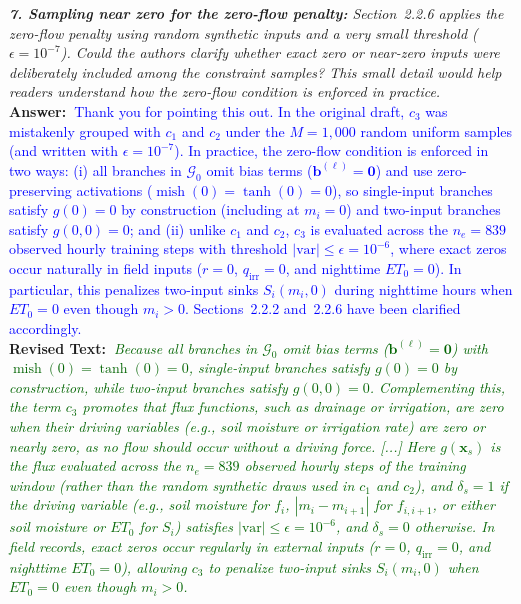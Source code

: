 \documentclass[10pt]{article}
\newcommand{\query}[2][]{\ifthenelse{\equal{#1}{}}{}{\textbf{#1:}~}\emph{#2}}
\newcommand{\ans}[1]{\textbf{Answer:~}#1}
\newcommand{\Rtext}[1]{\textbf{Revised Text:~}#1}
\begin{document}
\query[R-2.7]{\textbf{7. Sampling near zero for the zero-flow penalty:} Section~2.2.6 applies the zero-flow penalty using random synthetic inputs and a very small threshold ($\epsilon = 10^{-7}$). Could the authors clarify whether exact zero or near-zero inputs were deliberately included among the constraint samples? This small detail would help readers understand how the zero-flow condition is enforced in practice.}\\
\ans{\textcolor{blue}{Thank you for pointing this out. In the original draft, $c_3$ was mistakenly grouped with $c_1$ and $c_2$ under the $M = 1{,}000$ random uniform samples (and written with $\epsilon = 10^{-7}$). In practice, the zero-flow condition is enforced in two ways: (i) all branches in $\mathcal{G}_0$ omit bias terms ($\mathbf{b}^{(\ell)} = \mathbf{0}$) and use zero-preserving activations ($\operatorname{mish}(0) = \tanh(0) = 0$), so single-input branches satisfy $g(0) = 0$ by construction (including at $m_i = 0$) and two-input branches satisfy $g(0,0) = 0$; and (ii) unlike $c_1$ and $c_2$, $c_3$ is evaluated across the $n_e = 839$ observed hourly training steps with threshold $|\text{var}| \le \epsilon = 10^{-6}$, where exact zeros occur naturally in field inputs ($r = 0$, $q_{\mathrm{irr}} = 0$, and nighttime $ET_0 = 0$). In particular, this penalizes two-input sinks $S_i(m_i, 0)$ during nighttime hours when $ET_0 = 0$ even though $m_i > 0$. Sections~2.2.2 and~2.2.6 have been clarified accordingly.}}\\
\Rtext{\emph{\textcolor{darkgreen}{Because all branches in $\mathcal{G}_0$ omit bias terms ($\mathbf{b}^{(\ell)} = \mathbf{0}$) with $\operatorname{mish}(0) = \tanh(0) = 0$, single-input branches satisfy $g(0) = 0$ by construction, while two-input branches satisfy $g(0,0) = 0$. Complementing this, the term $c_3$ promotes that flux functions, such as drainage or irrigation, are zero when their driving variables (e.g., soil moisture or irrigation rate) are zero or nearly zero, as no flow should occur without a driving force. [...] Here $g(\mathbf{x}_s)$ is the flux evaluated across the $n_e = 839$ observed hourly steps of the training window (rather than the random synthetic draws used in $c_1$ and $c_2$), and $\delta_s = 1$ if the driving variable (e.g., soil moisture for $f_i$, $|m_i - m_{i+1}|$ for $f_{i,i+1}$, or either soil moisture or $ET_0$ for $S_i$) satisfies $|\text{var}| \le \epsilon = 10^{-6}$, and $\delta_s = 0$ otherwise. In field records, exact zeros occur regularly in external inputs ($r = 0$, $q_{\mathrm{irr}} = 0$, and nighttime $ET_0 = 0$), allowing $c_3$ to penalize two-input sinks $S_i(m_i, 0)$ when $ET_0 = 0$ even though $m_i > 0$.}}}
\end{document}
